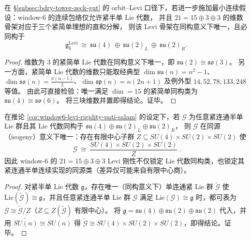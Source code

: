 \begin{corollary}[Levi 刚性锁定：由 \texorpdfstring{$21=15\oplus 3\oplus 3$}{21=15+3+3} 强制的 Pati--Salam 型骨架]\label{cor:window6-levi-rigidity-pati-salam}
在 \S\ref{subsec:bdry-tower-zeck-gut} 的 orbit--Levi 口径下，若进一步施加最小连续假设：window-\(6\) 的连续包络仅允许紧半单 Lie 代数，
并且 \(21=15\oplus 3\oplus 3\) 的维数骨架对应于三个紧简单理想的直和分解，
则该 Levi 骨架在同构意义下唯一，且必同构于
\[
\mathfrak g^{\mathrm{Levi}}_6\ \cong\ \mathfrak{su}(4)\ \oplus\ \mathfrak{su}(2)_L\ \oplus\ \mathfrak{su}(2)_R.
\]
\end{corollary}
\begin{proof}
维数为 \(3\) 的紧简单 Lie 代数在同构意义下唯一，即 \(\mathfrak{su}(2)\cong\mathfrak{so}(3)\)。
另一方面，紧简单 Lie 代数的维数只能取经典型
\(\dim\mathfrak{su}(n)=n^2-1\)、\(\dim\mathfrak{so}(n)=\frac{n(n-1)}2\)、\(\dim\mathfrak{sp}(n)=n(2n+1)\)
及例外型 \(14,52,78,133,248\) 等值。
由此可直接检验：唯一满足 \(\dim=15\) 的紧简单同构类为 \(\mathfrak{su}(4)\cong\mathfrak{so}(6)\)。
将三块维数并置即得结论。证毕。
\end{proof}

\begin{corollary}\label{cor:window6-levi-rigidity-pati-salam-isogeny}
在推论 \ref{cor:window6-levi-rigidity-pati-salam} 的设定下，若 \(\mathcal{G}\) 为任意紧连通半单 Lie 群且其 Lie 代数同构于
\(
\mathfrak{su}(4)\oplus\mathfrak{su}(2)_L\oplus\mathfrak{su}(2)_R
\)，
则 \(\mathcal{G}\) 在同源（isogeny）意义下唯一：存在有限中心子群 \(Z\subseteq SU(4)\times SU(2)\times SU(2)\) 使
\[
\boxed{\;
\mathcal{G}\ \cong\ \frac{SU(4)\times SU(2)\times SU(2)}{Z}\; }.
\]
因此 window-\(6\) 的 \(21=15\oplus 3\oplus 3\) Levi 刚性不仅锁定 Lie 代数同构类，也锁定其紧连通半单连续实现的同源类（差异仅可能来自有限中心商）。
\end{corollary}
\begin{proof}
对紧半单 Lie 代数 \(\mathfrak g\)，存在唯一（同构意义下）单连通紧 Lie 群 \(\widetilde{\mathcal{G}}\) 使 \(\mathrm{Lie}(\widetilde{\mathcal{G}})\cong\mathfrak g\)，并且任意紧连通半单 Lie 群 \(\mathcal{G}\) 满足 \(\mathrm{Lie}(\mathcal{G})\cong\mathfrak g\) 时，都可表为 \(\mathcal{G}\cong \widetilde{\mathcal{G}}/Z\)（\(Z\subseteq Z(\widetilde{\mathcal{G}})\) 有限中心）。
将 \(\mathfrak g=\mathfrak{su}(4)\oplus\mathfrak{su}(2)\oplus\mathfrak{su}(2)\) 代入，并用 \(\widetilde{SU(n)}\cong SU(n)\) 得 \(\widetilde{\mathcal{G}}\cong SU(4)\times SU(2)\times SU(2)\)，即得结论。证毕。
\end{proof}

